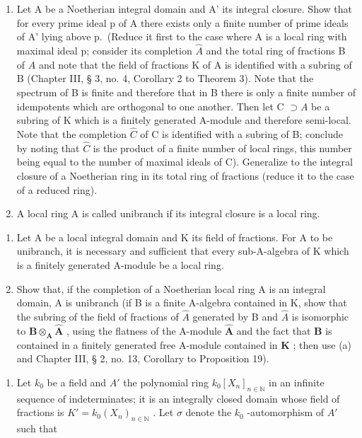 \begin{enumerate}
\item
  Let A be a Noetherian integral domain and A' its integral closure. Show that for every prime ideal p of A there exists only a finite number of prime ideals of A' lying above p.~(Reduce it first to the case where A is a local ring with maximal ideal p; consider its completion \(\hat{A}\) and the total ring of fractions B of \(\hat{A}\) and note that the field of fractions K of A is identified with a subring of B (Chapter III, § 3, no. 4, Corollary 2 to Theorem 3). Note that the spectrum of B is finite and therefore that in B there is only a finite number of idempotents which are orthogonal to one another. Then let C \(\supset A\) be a subring of K which is a finitely generated A-module and therefore semi-local. Note that the completion \(\hat{C}\) of C is identified with a subring of B; conclude by noting that \(\hat{C}\) is the product of a finite number of local rings, this number being equal to the number of maximal ideals of C). Generalize to the integral closure of a Noetherian ring in its total ring of fractions (reduce it to the case of a reduced ring).
\item
  A local ring A is called unibranch if its integral closure is a local ring.
\end{enumerate}

\begin{enumerate}
\def\labelenumi{(\alph{enumi})}
\item
  Let A be a local integral domain and K its field of fractions. For A to be unibranch, it is necessary and sufficient that every sub-A-algebra of K which is a finitely generated A-module be a local ring.
\item
  Show that, if the completion of a Noetherian local ring A is an integral domain, A is unibranch (if B is a finite A-algebra contained in K, show that the subring of the field of fractions of \(\hat{A}\) generated by B and \(\hat{A}\) is isomorphic to \(\mathbf{B} \otimes_{\mathbf{A}} \hat{\mathbf{A}}\) , using the flatness of the A-module \(\hat{\mathbf{A}}\) and the fact that \(\mathbf{B}\) is contained in a finitely generated free A-module contained in \(\mathbf{K}\) ; then use (a) and Chapter III, § 2, no. 13, Corollary to Proposition 19).
\end{enumerate}

\begin{enumerate}
\def\labelenumi{\arabic{enumi}.}
\setcounter{enumi}{8}
\tightlist
\item
  Let \(k_0\) be a field and \(A'\) the polynomial ring \(k_0[X_n]_{n \in \mathbb{N}}\) in an infinite sequence of indeterminates; it is an integrally closed domain whose field of fractions is \(K' = k_0(X_n)_{n \in \mathbb{N}}\) . Let \(\sigma\) denote the \(k_0\) -automorphism of \(A'\) such that
\end{enumerate}

